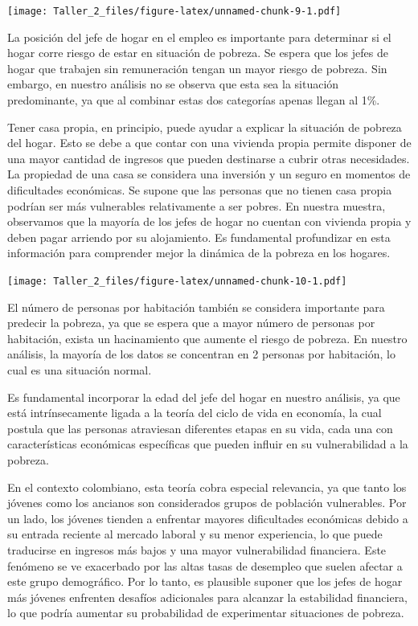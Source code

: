 \documentclass[
]{article}
\begin{document}
\texttt{[image: Taller\_2\_files/figure-latex/unnamed-chunk-9-1.pdf]}

La posición del jefe de hogar en el empleo es importante para determinar
si el hogar corre riesgo de estar en situación de pobreza. Se espera que
los jefes de hogar que trabajen sin remuneración tengan un mayor riesgo
de pobreza. Sin embargo, en nuestro análisis no se observa que esta sea
la situación predominante, ya que al combinar estas dos categorías
apenas llegan al 1\%.

Tener casa propia, en principio, puede ayudar a explicar la situación de
pobreza del hogar. Esto se debe a que contar con una vivienda propia
permite disponer de una mayor cantidad de ingresos que pueden destinarse
a cubrir otras necesidades. La propiedad de una casa se considera una
inversión y un seguro en momentos de dificultades económicas. Se supone
que las personas que no tienen casa propia podrían ser más vulnerables
relativamente a ser pobres. En nuestra muestra, observamos que la
mayoría de los jefes de hogar no cuentan con vivienda propia y deben
pagar arriendo por su alojamiento. Es fundamental profundizar en esta
información para comprender mejor la dinámica de la pobreza en los
hogares.

\texttt{[image: Taller\_2\_files/figure-latex/unnamed-chunk-10-1.pdf]}

El número de personas por habitación también se considera importante
para predecir la pobreza, ya que se espera que a mayor número de
personas por habitación, exista un hacinamiento que aumente el riesgo de
pobreza. En nuestro análisis, la mayoría de los datos se concentran en 2
personas por habitación, lo cual es una situación normal.

Es fundamental incorporar la edad del jefe del hogar en nuestro
análisis, ya que está intrínsecamente ligada a la teoría del ciclo de
vida en economía, la cual postula que las personas atraviesan diferentes
etapas en su vida, cada una con características económicas específicas
que pueden influir en su vulnerabilidad a la pobreza.

En el contexto colombiano, esta teoría cobra especial relevancia, ya que
tanto los jóvenes como los ancianos son considerados grupos de población
vulnerables. Por un lado, los jóvenes tienden a enfrentar mayores
dificultades económicas debido a su entrada reciente al mercado laboral
y su menor experiencia, lo que puede traducirse en ingresos más bajos y
una mayor vulnerabilidad financiera. Este fenómeno se ve exacerbado por
las altas tasas de desempleo que suelen afectar a este grupo
demográfico. Por lo tanto, es plausible suponer que los jefes de hogar
más jóvenes enfrenten desafíos adicionales para alcanzar la estabilidad
financiera, lo que podría aumentar su probabilidad de experimentar
situaciones de pobreza.
\end{document}
